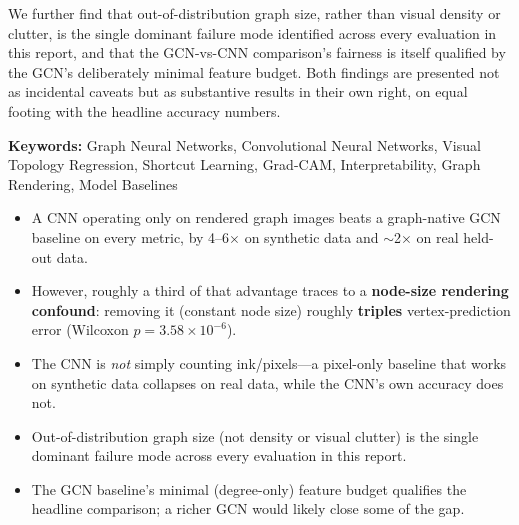 \documentclass[11pt,letterpaper]{article}
\numberwithin{equation}{section}
\numberwithin{figure}{section}
\numberwithin{table}{section}
\begin{document}
We further find that out-of-distribution graph size, rather than visual density or clutter, is the single dominant failure mode identified across every evaluation in this report, and that the GCN-vs-CNN comparison's fairness is itself qualified by the GCN's deliberately minimal feature budget. Both findings are presented not as incidental caveats but as substantive results in their own right, on equal footing with the headline accuracy numbers.

\vspace{8pt}
\noindent\textbf{Keywords:} Graph Neural Networks, Convolutional Neural Networks, Visual Topology Regression, Shortcut Learning, Grad-CAM, Interpretability, Graph Rendering, Model Baselines

\vspace{18pt}
\begin{tcolorbox}[
    colback=accent!6,
    colframe=accent,
    boxrule=0.8pt,
    arc=2pt,
    left=10pt, right=10pt, top=8pt, bottom=8pt,
    title={\bfseries Key Findings},
    coltitle=white,
    colbacktitle=accent,
    fonttitle=\bfseries
]
\begin{itemize}[leftmargin=14pt, itemsep=3pt, topsep=2pt]
    \item A CNN operating only on rendered graph images beats a graph-native GCN baseline on every metric, by 4--6$\times$ on synthetic data and $\sim$2$\times$ on real held-out data.
    \item However, roughly a third of that advantage traces to a \textbf{node-size rendering confound}: removing it (constant node size) roughly \textbf{triples} vertex-prediction error (Wilcoxon $p=3.58\times10^{-6}$).
    \item The CNN is \emph{not} simply counting ink/pixels---a pixel-only baseline that works on synthetic data collapses on real data, while the CNN's own accuracy does not.
    \item Out-of-distribution graph size (not density or visual clutter) is the single dominant failure mode across every evaluation in this report.
    \item The GCN baseline's minimal (degree-only) feature budget qualifies the headline comparison; a richer GCN would likely close some of the gap.
\end{itemize}
\end{tcolorbox}

\clearpage
\tableofcontents
\clearpage
\listoffigures
\clearpage
\listoftables
\clearpage

\end{document}
